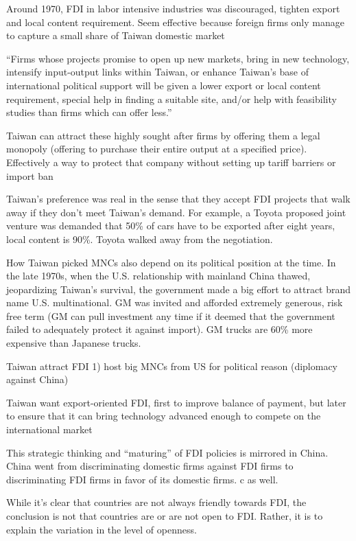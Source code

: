 Around 1970, FDI in labor intensive industries was discouraged, tighten export
and local content requirement. Seem effective because foreign firms only manage
to capture a small share of Taiwan domestic market

``Firms whose projects promise to open up new markets, bring in new technology,
intensify input-output links within Taiwan, or enhance Taiwan's base of
international political support will be given a lower export or local content
requirement, special help in finding a suitable site, and/or help with
feasibility studies than firms which can offer less.''

Taiwan can attract these highly sought after firms by offering them a legal
monopoly (offering to purchase their entire output at a specified price).
Effectively a way to protect that company without setting up tariff barriers or
import ban

Taiwan's preference was real in the sense that they accept FDI projects that
walk away if they don't meet Taiwan's demand. For example, a Toyota proposed
joint venture was demanded that 50\% of cars have to be exported after eight
years, local content is 90\%. Toyota walked away from the negotiation.

How Taiwan picked MNCs also depend on its political position at the time. In the
late 1970s, when the U.S. relationship with mainland China thawed, jeopardizing
Taiwan's survival, the government made a big effort to attract brand name U.S.
multinational. GM was invited and afforded extremely generous, risk free term
(GM can pull investment any time if it deemed that the government failed to
adequately protect it against import). GM trucks are 60\% more expensive than
Japanese trucks. \citep{Noble1987}

Taiwan attract FDI 1) host big MNCs from US for political reason (diplomacy
against China)

Taiwan want export-oriented FDI, first to improve balance of payment, but later
to ensure that it can bring technology advanced enough to compete on the
international market \citep[152]{Wade1990}

This strategic thinking and ``maturing'' of FDI policies is mirrored in China.
China went from discriminating domestic firms against FDI firms to
discriminating FDI firms in favor of its domestic firms. c as well.

While it's clear that countries are not always friendly towards FDI, the
conclusion is not that countries are or are not open to FDI. Rather, it is to
explain the variation in the level of openness.



